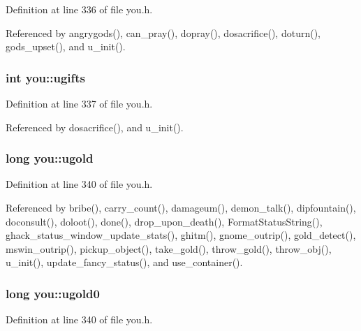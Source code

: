 Definition at line 336 of file you.\+h.



Referenced by angrygods(), can\+\_\+pray(), dopray(), dosacrifice(), doturn(), gods\+\_\+upset(), and u\+\_\+init().

\hypertarget{structyou_a36cd4ba10c14318080dfb1bc1cdcdcf7}{
\subsubsection[{ugifts}]{\setlength{\rightskip}{0pt plus 5cm}int you\+::ugifts}}\label{structyou_a36cd4ba10c14318080dfb1bc1cdcdcf7}


Definition at line 337 of file you.\+h.



Referenced by dosacrifice(), and u\+\_\+init().

\hypertarget{structyou_af666e1fd44c5efe34df9053aef068245}{
\subsubsection[{ugold}]{\setlength{\rightskip}{0pt plus 5cm}long you\+::ugold}}\label{structyou_af666e1fd44c5efe34df9053aef068245}


Definition at line 340 of file you.\+h.



Referenced by bribe(), carry\+\_\+count(), damageum(), demon\+\_\+talk(), dipfountain(), doconsult(), doloot(), done(), drop\+\_\+upon\+\_\+death(), Format\+Status\+String(), ghack\+\_\+status\+\_\+window\+\_\+update\+\_\+stats(), ghitm(), gnome\+\_\+outrip(), gold\+\_\+detect(), mswin\+\_\+outrip(), pickup\+\_\+object(), take\+\_\+gold(), throw\+\_\+gold(), throw\+\_\+obj(), u\+\_\+init(), update\+\_\+fancy\+\_\+status(), and use\+\_\+container().

\hypertarget{structyou_a2f0d94fc447b721c2f289fcc201cab38}{
\subsubsection[{ugold0}]{\setlength{\rightskip}{0pt plus 5cm}long you\+::ugold0}}\label{structyou_a2f0d94fc447b721c2f289fcc201cab38}


Definition at line 340 of file you.\+h.



